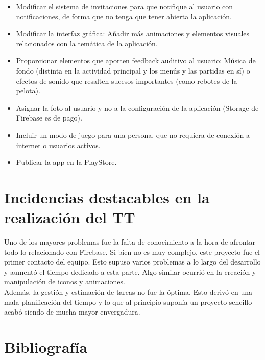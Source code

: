 \documentclass[a4paper,openright,12pt]{article}
\begin{document}
\begin{itemize}

\item Modificar el sistema de invitaciones para que notifique al usuario con notificaciones, de forma que no tenga que tener abierta la aplicación.

\item Modificar la interfaz gráfica: Añadir más animaciones y elementos visuales relacionados con la temática de la aplicación.

\item Proporcionar elementos que aporten feedback auditivo al usuario: Música de fondo (distinta en la actividad principal y los menús y las partidas en sí) o efectos de sonido que resalten sucesos importantes (como rebotes de la pelota).

\item Asignar la foto al usuario y no a la configuración de la aplicación (Storage de Firebase es de pago).

\item Incluir un modo de juego para una persona, que no requiera de conexión a internet o usuarios activos.

\item Publicar la app en la PlayStore.

\end{itemize}

\section{Incidencias destacables en la realización del TT}
Uno de los mayores problemas fue la falta de conocimiento a la hora de afrontar todo lo relacionado con Firebase. Si bien no es muy complejo, este proyecto fue el primer contacto del equipo. Esto supuso varios problemas a lo largo del desarrollo y aumentó el tiempo dedicado a esta parte. Algo similar ocurrió en la creación y manipulación de iconos y animaciones. \\
Además, la gestión y estimación de tareas no fue la óptima. Esto derivó en una mala planificación del tiempo y lo que al principio suponía un proyecto sencillo acabó siendo de mucha mayor envergadura.


\section{Bibliografía}


\end{document}
